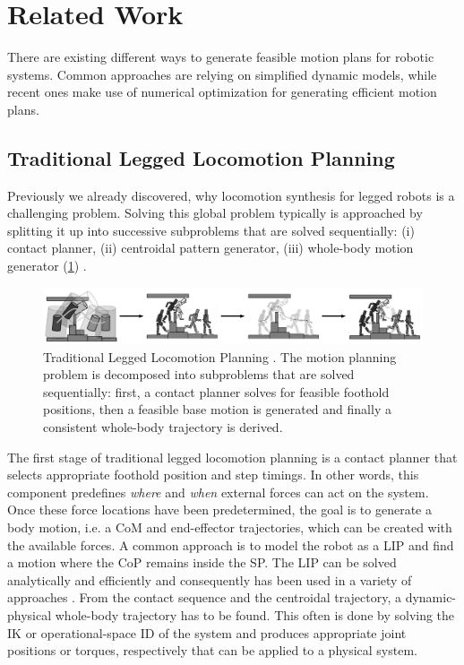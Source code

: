 \section{Related Work}\label{sec:IntroRelated}
There are existing different ways to generate feasible motion plans for robotic systems. Common approaches are relying on simplified dynamic models, while recent ones make use of numerical optimization for generating efficient motion plans. 

\subsection{Traditional Legged Locomotion Planning}
Previously we already discovered, why locomotion synthesis for legged robots is a challenging problem. Solving this global problem typically is approached by splitting it up into successive subproblems that are solved sequentially: (i) contact planner, (ii) centroidal pattern generator, (iii) whole-body motion generator (\cref{img:traditional_locomotion_planner}) \cite{carpentier2017multi}. 

\begin{figure}
\centering	
\includegraphics[width=1\textwidth]{img/traditional_locomotion_planner_bw}
\caption[Traditional Legged Locomotion Planning]{Traditional Legged Locomotion Planning \cite{giraud2020motion}. The motion planning problem is decomposed into subproblems that are solved sequentially: first, a contact planner solves for feasible foothold positions, then a feasible base motion is generated and finally a consistent whole-body trajectory is derived.}
\label{img:traditional_locomotion_planner}
\end{figure} 
 
The first stage of traditional legged locomotion planning is a contact planner that selects appropriate foothold position and step timings. In other words, this component predefines \textit{where} and \textit{when} external forces can act on the system. 
Once these force locations have been predetermined, the goal is to generate a body motion, i.e. a \gls{CoM} and end-effector trajectories, which can be created with the available forces. A common approach is to model the robot as a \gls{LIP} and find a motion where the \gls{CoP} remains inside the \gls{SP}. The \gls{LIP} can be solved analytically and efficiently and consequently has been used in a variety of approaches \cite{kajita2003biped, kalakrishnan2010fast, winkler2015planning, bellicoso2017dynamic}. 
From the contact sequence and the centroidal trajectory, a dynamic-physical whole-body trajectory has to be found. This often is done by solving the \gls{IK} \cite{espiau1992new} or operational-space \gls{ID} \cite{khatib1987unified} of the system and produces appropriate joint positions or torques, respectively that can be applied to a physical system.

